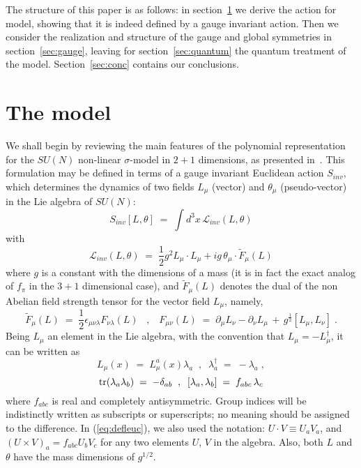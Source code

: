 \documentclass[a4paper,12pt]{article}
\begin{document}
The structure of this paper is as follows: in
section~\ref{sec:themodel} we derive the action for model, showing
that it is indeed defined by a gauge invariant action. Then we
consider the realization and structure of the gauge and global
symmetries in section~\ref{sec:gauge}, leaving for
section~\ref{sec:quantum} the quantum treatment of the model.
Section~\ref{sec:conc} contains our conclusions.

\section{The model}\label{sec:themodel}
We shall begin by reviewing the main features of the polynomial
representation for the $SU(N)$ non-linear $\sigma$-model in $2+1$
dimensions, as presented in~\cite{fm1,fm2}.  This formulation may be
defined in terms of a gauge invariant Euclidean action $S_{inv}$,
which determines the dynamics of two fields $L_\mu$ (vector) and
$\theta_\mu$ (pseudo-vector) in the Lie algebra of $SU(N)$:
\begin{equation}\label{eq:defseuc}
S_{inv}[L,\theta] \;=\; \int d^3x \,{\mathcal L}_{inv} (L,\theta)
\end{equation}
with
\begin{equation}\label{eq:defleuc}
{\mathcal L}_{inv}(L,\theta)\;=\; \frac{1}{2} g^2 L_{\mu}\cdot L_\mu
+ i g \,\theta_\mu \cdot {\tilde F}_\mu(L)
\end{equation}
where $g$ is a constant with the dimensions of a mass (it is in fact
the exact analog of $f_\pi$ in the $3+1$ dimensional case), and
${\tilde F}_\mu (L)$ denotes the dual of the non Abelian field
strength tensor for the vector field $L_\mu$, namely,
\begin{equation}\label{eq:defFt}
{\tilde F}_\mu (L) \;=\; \frac{1}{2}\epsilon_{\mu\nu\lambda} F_{\nu\lambda}(L)
\;\;\;,\;\;\;
F_{\mu\nu}(L) \;=\; \partial_\mu L_\nu - \partial_\nu L_\mu
\,+\, g^{\frac{1}{2}} [L_\mu , L_\nu ] \;.
\end{equation}
Being $L_\mu$ an element in the Lie algebra, with the convention that
$L_\mu = - L_\mu^\dagger$, it can be written as
$$
L_\mu(x) \;=\; L_\mu^a (x) \lambda_a \;\;,\;\; \lambda_a^\dagger
\;=\; - \lambda_a \;,
$$
\begin{equation}\label{eq:conv}
{\rm tr} (\lambda_a \lambda_b) \;=\; - \delta_{a b}\;\;,\;\;
[\lambda_a , \lambda_b ] \;=\; f_{a b c} \, \lambda_c
\end{equation}
where $f_{a b c}$ is real and completely antisymmetric. Group indices
will be indistinctly written as subscripts or superscripts; no meaning
should be assigned to the difference.  In (\ref{eq:defleuc}), we also
used the notation: $U \cdot V \equiv U_a V_a$, and $(U \times V)_a =
f_{a b c} U_b V_c$ for any two elements $U$, $V$ in the algebra. Also,
both $L$ and $\theta$ have the mass dimensions of $g^{1/2}$.
\end{document}

